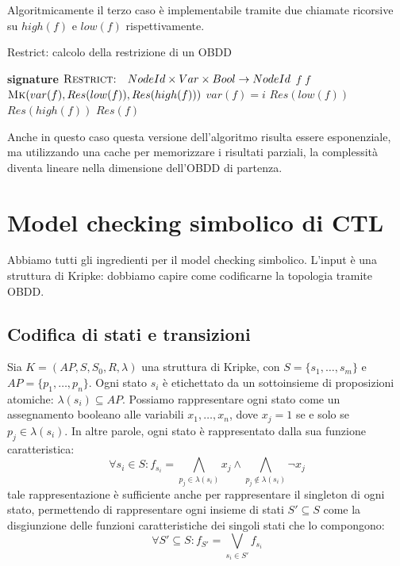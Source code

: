 Algoritmicamente il terzo caso è implementabile tramite due chiamate ricorsive su \(high(f)\) e \(low(f)\) rispettivamente.

\begin{algorithmdesc}{Restrict: calcolo della restrizione di un OBDD}
  \begin{algorithmic}[1]
    \Statex{} \textbf{signature} \(\textsc{Restrict:} \quad NodeId \times Var \times Bool \to NodeId\)
        \State{} \Return{} \(f\)
      \EndIf{}
          \State{} \Return{} \(f\)
          \State{} \Return{} \(\textsc{Mk}(var(f), Res(low(f)), Res(high(f)))\)
        \Else{}\Comment{} \(var(f) = i\)
            \State{} \Return{} \(Res(low(f))\)
          \Else{}
            \State{} \Return{} \(Res(high(f))\)
          \EndIf{}
        \EndIf{}
      \EndFunction{}
      \State{} \Return{} \(Res(f)\)
    \EndFunction{}
  \end{algorithmic}
\end{algorithmdesc}

Anche in questo caso questa versione dell'algoritmo risulta essere esponenziale, ma utilizzando una cache per memorizzare i risultati parziali, la complessità diventa lineare nella dimensione dell'OBDD di partenza.

\section{Model checking simbolico di CTL}
Abbiamo tutti gli ingredienti per il model checking simbolico. L'input è una struttura di Kripke: dobbiamo capire come codificarne la topologia tramite OBDD\@.

\subsection{Codifica di stati e transizioni}
Sia \(K = (AP,S,S_0,R,\lambda)\) una struttura di Kripke, con \(S = \{s_1, \ldots, s_m\}\) e \(AP = \{p_1, \ldots, p_n\}\). Ogni stato \(s_i\) è etichettato da un sottoinsieme di proposizioni atomiche: \(\lambda(s_i) \subseteq AP\). Possiamo rappresentare ogni stato come un assegnamento booleano alle variabili \(x_1, \ldots, x_n\), dove \(x_j = 1\) se e solo se \(p_j \in \lambda(s_i)\). In altre parole, ogni stato è rappresentato dalla sua funzione caratteristica:
\[\forall s_i \in S: f_{s_i} = \bigwedge_{p_j \in \lambda(s_i)} x_j \land \bigwedge_{p_j \notin \lambda(s_i)} \neg x_j\]
tale rappresentazione è sufficiente anche per rappresentare il singleton di ogni stato, permettendo di rappresentare ogni insieme di stati \(S'\subseteq S\) come la disgiunzione delle funzioni caratteristiche dei singoli stati che lo compongono:
\[\forall S' \subseteq S: f_{S'} = \bigvee_{s_i \in S'} f_{s_i}\]

